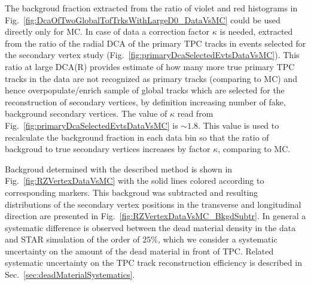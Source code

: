 
The backgroud fraction extracted from the ratio of violet and red histograms in Fig.~\ref{fig:DcaOfTwoGlobalTofTrksWithLargeD0_DataVsMC} could be used directly only for MC. In case of data a correction factor $\kappa$ is needed, extracted from the ratio of the radial DCA of the primary TPC tracks in events selected for the secondary vertex study (Fig.~\ref{fig:primaryDcaSelectedEvtsDataVsMC}). This ratio at large DCA(R) provides estimate of how many more true primary TPC tracks in the data are not recognized as primary tracks (comparing to MC) and hence overpopulate/enrich sample of global tracks which are selected for the reconstruction of secondary vertices, by definition increasing number of fake, background secondary vertices. The value of $\kappa$ read from Fig.~\ref{fig:primaryDcaSelectedEvtsDataVsMC} is $\sim 1.8$. This value is used to recalculate the background fraction in each data bin so that the ratio of backgroud to true secondary vertices increases by factor $\kappa$, comparing to MC.

Backgroud determined with the described method is shown in Fig.~\ref{fig:RZVertexDataVsMC} with the solid lines colored according to corresponding markers. This backgroud was subtracted and resulting distributions of the secondary vertex positions in the transverse and longitudinal direction are presented in Fig.~\ref{fig:RZVertexDataVsMC_BkgdSubtr}. In general a systematic difference is observed between the dead material density in the data and STAR simulation of the order of $25\%$, which we consider a systematic uncertainty on the amount of the dead material in front of TPC. Related systematic uncertainty on the TPC track reconstruction efficiency is described in Sec.~\ref{sec:deadMaterialSystematics}.\newpage



